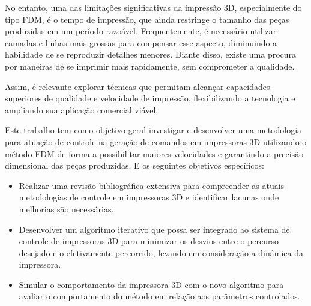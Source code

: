 No entanto, uma das limitações significativas da impressão 3D, especialmente do tipo FDM, é o tempo de
impressão, que ainda restringe o tamanho das peças produzidas em um período razoável. Frequentemente, é
necessário utilizar camadas e linhas mais grossas para compensar esse aspecto, diminuindo a habilidade de
se reproduzir detalhes menores. Diante disso, existe uma procura por maneiras de se imprimir mais rapidamente,
sem comprometer a qualidade.

Assim, é relevante explorar técnicas que permitam alcançar capacidades superiores de qualidade e
velocidade de impressão, flexibilizando a tecnologia e ampliando sua aplicação comercial viável.

Este trabalho tem como objetivo geral investigar e desenvolver uma metodologia para atuação de controle na geração de
comandos em impressoras 3D utilizando o método FDM de forma a possibilitar maiores velocidades e garantindo a precisão dimensional das peças produzidas. E os seguintes objetivos específicos: 
\begin{itemize}
    \item Realizar uma revisão bibliográfica extensiva para compreender as atuais metodologias de controle em impressoras 3D e identificar lacunas onde melhorias são necessárias.
    \item Desenvolver um algoritmo iterativo que possa ser integrado ao sistema de controle de impressoras 3D para minimizar os desvios entre o percurso desejado e o efetivamente percorrido, levando em consideração a dinâmica da impressora.
    \item Simular o comportamento da impressora 3D com o novo algoritmo para avaliar o comportamento do método em relação aos parâmetros controlados.
\end{itemize}


